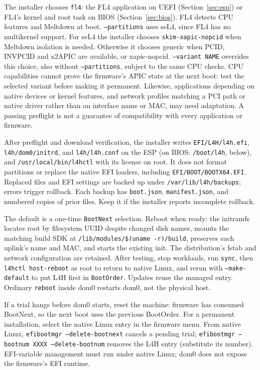 \documentclass[11pt,a4paper]{report}
\newcommand{\cmd}[1]{\texttt{#1}}
\newcommand{\file}[1]{\texttt{#1}}
\begin{document}
The installer chooses \texttt{fl4}: the FL4 application on UEFI
(Section~\ref{sec:esp}) or FL4's kernel and root task on BIOS
(Section~\ref{sec:bios}). FL4 detects CPU features and Meltdown at boot.
\texttt{--partitions} uses seL4, since FL4 has no multikernel support.
For seL4 the installer chooses
\texttt{skim-xapic-nopcid} when Meltdown isolation is needed. Otherwise
it chooses generic when PCID, INVPCID and x2APIC are available, or
xapic-nopcid. \texttt{--variant NAME} overrides this choice, also
without \texttt{--partitions}, subject to the same CPU checks. CPU capabilities cannot prove the
firmware's APIC state at the next boot: test the selected variant before making it permanent.
Likewise, applications depending on native devices or kernel features,
and network profiles matching a PCI path or native driver rather than
an interface name or MAC, may need adaptation. A passing preflight is
not a guarantee of compatibility with every application or firmware.

After preflight and download verification, the installer writes
\file{EFI/L4H/l4h.efi}, \file{l4h/dom0/initrd}, and \file{l4h/l4h.conf} on
the ESP (on BIOS: \file{/boot/l4h}, below), and \file{/usr/local/bin/l4hctl} with its license on root. It
does not format partitions or replace the native EFI loaders, including
\file{EFI/BOOT/BOOTX64.EFI}. Replaced files and EFI settings are backed
up under \file{/var/lib/l4h/backups}; errors trigger rollback. Each backup
has \file{boot.json}, \file{manifest.json}, and numbered copies of prior
files. Keep it if the installer reports incomplete rollback.

The default is a one-time \texttt{BootNext} selection. Reboot when ready:
the initramfs locates root by filesystem UUID despite changed disk names,
mounts the matching build SDK at \file{/lib/modules/\$(uname -r)/build},
preserves each uplink's name and MAC, and starts the existing init.
The distribution's fstab and network configuration are retained. After
testing, stop workloads, run \cmd{sync}, then \cmd{l4hctl host-reboot}
as root to return to native Linux, and rerun with \texttt{--make-default}
to put L4H first in \texttt{BootOrder}. Updates reuse the managed entry.
Ordinary \cmd{reboot} inside dom0 restarts dom0, not the physical host.

If a trial hangs before dom0 starts, reset the machine: firmware has
consumed BootNext, so the next boot uses the previous BootOrder. For a
permanent installation, select the native Linux entry in the firmware
menu. From native Linux, \cmd{efibootmgr --delete-bootnext} cancels a
pending trial; \cmd{efibootmgr --bootnum XXXX --delete-bootnum} removes
the L4H entry (substitute its number). EFI-variable management must run
under native Linux; dom0 does not expose the firmware's EFI runtime.
\end{document}
